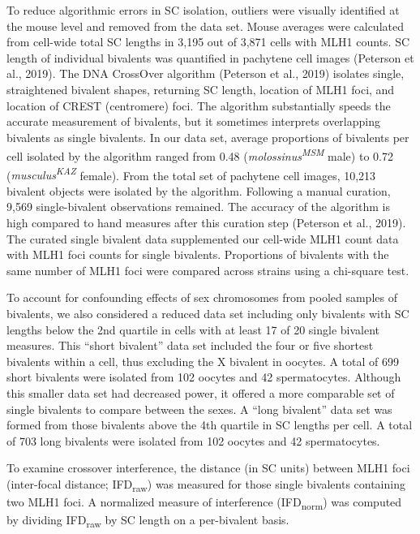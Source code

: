 \documentclass[
]{article}
\begin{document}
To reduce algorithmic errors in SC isolation, outliers were visually
identified at the mouse level and removed from the data set. Mouse
averages were calculated from cell-wide total SC lengths in 3,195 out of
3,871 cells with MLH1 counts. SC length of individual bivalents was
quantified in pachytene cell images (Peterson et al., 2019). The DNA
CrossOver algorithm (Peterson et al., 2019) isolates single,
straightened bivalent shapes, returning SC length, location of MLH1
foci, and location of CREST (centromere) foci. The algorithm
substantially speeds the accurate measurement of bivalents, but it
sometimes interprets overlapping bivalents as single bivalents. In our
data set, average proportions of bivalents per cell isolated by the
algorithm ranged from 0.48 (\emph{molossinus\textsuperscript{MSM}} male)
to 0.72 (\emph{musculus\textsuperscript{KAZ}} female). From the total
set of pachytene cell images, 10,213 bivalent objects were isolated by
the algorithm. Following a manual curation, 9,569 single-bivalent
observations remained. The accuracy of the algorithm is high compared to
hand measures after this curation step (Peterson et al., 2019). The
curated single bivalent data supplemented our cell-wide MLH1 count data
with MLH1 foci counts for single bivalents. Proportions of bivalents
with the same number of MLH1 foci were compared across strains using a
chi-square test.

To account for confounding effects of sex chromosomes from pooled
samples of bivalents, we also considered a reduced data set including
only bivalents with SC lengths below the 2nd quartile in cells with at
least 17 of 20 single bivalent measures. This ``short bivalent'' data
set included the four or five shortest bivalents within a cell, thus
excluding the X bivalent in oocytes. A total of 699 short bivalents were
isolated from 102 oocytes and 42 spermatocytes. Although this smaller
data set had decreased power, it offered a more comparable set of single
bivalents to compare between the sexes. A ``long bivalent'' data set was
formed from those bivalents above the 4th quartile in SC lengths per
cell. A total of 703 long bivalents were isolated from 102 oocytes and
42 spermatocytes.

To examine crossover interference, the distance (in SC units) between
MLH1 foci (inter-focal distance; IFD\textsubscript{raw}) was measured
for those single bivalents containing two MLH1 foci. A normalized
measure of interference (IFD\textsubscript{norm}) was computed by
dividing IFD\textsubscript{raw} by SC length on a per-bivalent basis.
\end{document}
